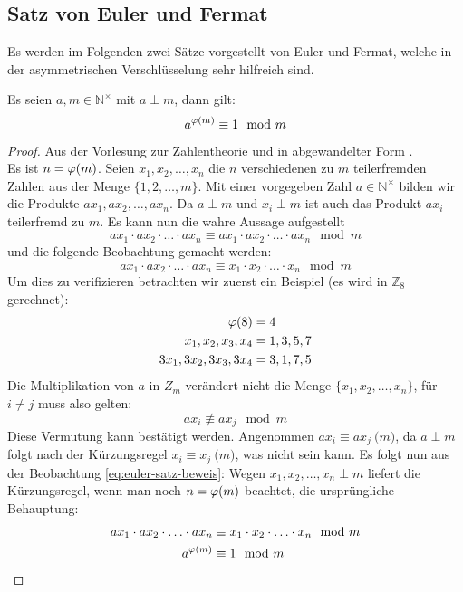 \subsection{Satz von Euler und Fermat}
Es werden im Folgenden zwei Sätze vorgestellt von Euler und Fermat, welche
in der asymmetrischen Verschlüsselung sehr hilfreich sind.
\begin{satz}
  Es seien $a,m \in \mathbb{N}^\times$ mit $a \perp m$, dann gilt:
  \begin{equation*}
    a^{\varphi(m)} \equiv 1 \mod{m}
  \end{equation*}
\end{satz}
\begin{proof}
  Aus der Vorlesung zur Zahlentheorie \parencite{SITE:phi-euler-fermat} und in
  abgewandelter Form \parencite[187-188]{BOOK:numberTheory}. \\
  Es ist $n = \varphi(m)$. Seien $x_1,x_2,\ldots,x_n$ die $n$ verschiedenen zu
  $m$ teilerfremden Zahlen aus der Menge $\{1,2,\ldots,m\}$. Mit einer vorgegeben Zahl
  $a \in \mathbb{N}^\times$ bilden wir die Produkte $ax_1,ax_2,\ldots,ax_n$.
  Da $a \perp m$ und $x_i \perp m$ ist auch das Produkt $ax_i$ teilerfremd zu $m$.
  Es kann nun die wahre Aussage aufgestellt
  \begin{equation*}
    ax_1 \cdot ax_2 \cdot \ldots \cdot ax_n \equiv
    ax_1 \cdot ax_2 \cdot \ldots \cdot ax_n \mod{m}
  \end{equation*}
  und die folgende Beobachtung gemacht werden:
  \begin{equation*}
    \label{eq:euler-satz-beweis}
    ax_1 \cdot ax_2 \cdot \ldots \cdot ax_n \equiv
    x_1 \cdot x_2 \cdot \ldots \cdot x_n  \mod{m} \tag{$\ast$}
  \end{equation*}
  Um dies zu verifizieren betrachten wir zuerst ein Beispiel (es wird in $\mathbb{Z}_8$ gerechnet):
  \begin{align*}
    \varphi(8)            & = 4       \\
    x_1,x_2,x_3,x_4     & = 1,3,5,7 \\
    3x_1,3x_2,3x_3,3x_4 & = 3,1,7,5
  \end{align*}
  Die Multiplikation von $a$ in $Z_m$ verändert nicht die Menge $\{x_1,x_2,\ldots,x_n\}$,
  für $i \neq j$ muss also gelten:
  \begin{equation*}
    ax_i \not\equiv ax_j \mod{m}
  \end{equation*}
  Diese Vermutung kann bestätigt werden. Angenommen
  $ax_i \equiv ax_j \pod{m}$, da $a \perp m$ folgt nach der Kürzungsregel
  $x_i \equiv x_j \pod{m}$, was nicht sein kann.
  Es folgt nun aus der Beobachtung \eqref{eq:euler-satz-beweis}:
  Wegen $x_1,x_2,\ldots,x_n \perp m$ liefert die Kürzungsregel, wenn man noch
  $n = \varphi(m)$ beachtet, die ursprüngliche Behauptung:
  \begin{align*}
    ax_1 \cdot ax_2 \cdot \ldots \cdot ax_n & \equiv
    x_1 \cdot x_2 \cdot \ldots \cdot x_n  \mod{m}              \\
    a^{\varphi(m)}                            & \equiv 1 \mod{m}
  \end{align*}
\end{proof}

